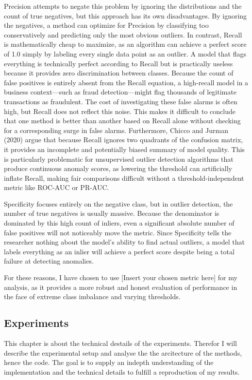 Precision attempts to negate this problem by ignoring the distributions and the count of true negatives, but this approach has its own disadvantages. 
By ignoring the negatives, a method can optimize for Precision by classifying too conservatively and predicting only the most obvious outliers. 
In contrast, Recall is mathematically cheap to maximize, as an algorithm can achieve a perfect score of 1.0 simply by labeling every single data point as an outlier. 
A model that flags everything is technically perfect according to Recall but is practically useless because it provides zero discrimination between classes. 
Because the count of false positives is entirely absent from the Recall equation, a high-recall model in a business context—such as fraud detection—might flag thousands of legitimate transactions as fraudulent. 
The cost of investigating these false alarms is often high, but Recall does not reflect this noise. 
This makes it difficult to conclude that one method is better than another based on Recall alone without checking for a corresponding surge in false alarms. 
Furthermore, Chicco and Jurman (2020) argue that because Recall ignores two quadrants of the confusion matrix, it provides an incomplete and potentially biased summary of model quality. 
This is particularly problematic for unsupervised outlier detection algorithms that produce continuous anomaly scores, as lowering the threshold can artificially inflate Recall, making fair comparisons difficult without a threshold-independent metric like ROC-AUC or PR-AUC.


Specificity focuses entirely on the negative class, but in outlier detection, the number of true negatives is usually massive. 
Because the denominator is dominated by this high count of inliers, even a significant absolute number of false positives will not noticeably move the metric.  \citep{saito2015precision} 
Since Specificity tells the researcher nothing about the model's ability to find actual outliers, a model that labels everything as an inlier will achieve a perfect score despite being a total failure at detecting anomalies.

For these reasons, I have chosen to use [Insert your chosen metric here] for my analysis, as it provides a more robust and honest evaluation of performance in the face of extreme class imbalance and varying thresholds.


\subsection{Experiments}
This chapter is about the technical destails of the experiments.
Therefor I will describe the experimental setup and analyse the the arcitecture of the methods, hence the code.
The goal is to supply an indepth understanding of the implementation and the technical details to fulfill a reproduction of my results. 


